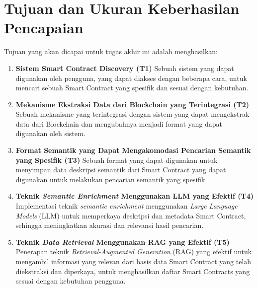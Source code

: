 \section{Tujuan dan Ukuran Keberhasilan Pencapaian}
\label{sec:tujuan-ukuran-keberhasilan-pencapaian}


Tujuan yang akan dicapai untuk tugas akhir ini adalah menghasilkan: 

\begin{enumerate}
  \item \textbf{Sistem Smart Contract Discovery (T1)} \newline
  Sebuah sistem yang dapat digunakan oleh pengguna, yang dapat diakses dengan beberapa cara, untuk mencari sebuah Smart Contract yang spesifik dan sesuai dengan kebutuhan.

  \item \textbf{Mekanisme Ekstraksi Data dari Blockchain yang Terintegrasi (T2)} \newline
  Sebuah mekanisme yang terintegrasi dengan sistem yang dapat mengekstrak data dari Blockchain dan mengubahnya menjadi format yang dapat digunakan oleh sistem.

  \item \textbf{Format Semantik yang Dapat Mengakomodasi Pencarian Semantik yang Spesifik (T3)} \newline
  Sebuah format yang dapat digunakan untuk menyimpan data deskripsi semantik dari Smart Contract yang dapat digunakan untuk melakukan pencarian semantik yang spesifik. 

  \item \textbf{Teknik \textit{Semantic Enrichment} Menggunakan LLM yang Efektif (T4)} \newline
  Implementasi teknik \textit{semantic enrichment} menggunakan \textit{Large Language Models} (LLM) untuk memperkaya deskripsi dan metadata Smart Contract, sehingga meningkatkan akurasi dan relevansi hasil pencarian.

  \item \textbf{Teknik \textit{Data Retrieval} Menggunakan RAG yang Efektif (T5)} \newline
  Penerapan teknik \textit{Retrieval-Augmented Generation} (RAG) yang efektif untuk mengambil informasi yang relevan dari basis data Smart Contract yang telah diekstraksi dan diperkaya, untuk menghasilkan daftar Smart Contracts yang sesuai dengan kebutuhan pengguna.
  
\end{enumerate}

